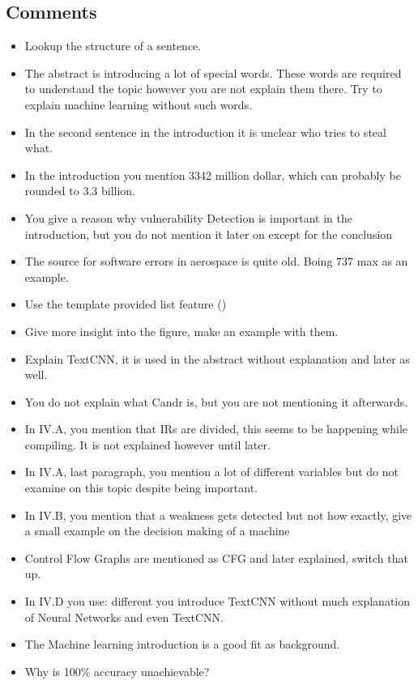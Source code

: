 \documentclass[peerreview, 10pt, onecolumn]{IEEEtran}
\begin{document}
\subsection*{Comments}
    \begin{itemize}
        \item Lookup the structure of a sentence.
        \item The abstract is introducing a lot of special words. These words are required to understand the topic however you are not explain them there. Try to explain machine learning without such words.
        \item In the second sentence in the introduction it is unclear who tries to steal what.
        \item In the introduction you mention 3342 million dollar, which can probably be rounded to 3.3 billion.
        \item You give a reason why vulnerability Detection is important in the introduction, but you do not mention it later on except for the conclusion
        \item The source for software errors in aerospace is quite old. Boing 737 max as an example.         \item Use the template provided list feature ()
        \item Give more insight into the figure, make an example with them.
        \item Explain TextCNN, it is used in the abstract without explanation and later as well.
        \item You do not explain what Candr is, but you are not mentioning it afterwards.
        \item In IV.A, you mention that IRs are divided, this seems to be happening while compiling. It is not explained however until later.
        \item In IV.A, last paragraph, you mention a lot of different variables but do not examine on this topic despite being important. 
        \item In IV.B, you mention that a weakness gets detected but not how exactly, give a small example on the decision making of a machine 
        \item Control Flow Graphs are mentioned as CFG and later explained, switch that up.
        \item In IV.D you use: different you introduce TextCNN without much explanation of Neural Networks and even TextCNN. 
        \item The Machine learning introduction is a good fit as background.
        \item Why is 100\% accuracy unachievable?
    \end{itemize}
\end{document}
